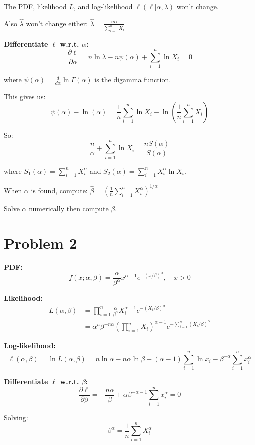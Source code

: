 \documentclass{article}
\begin{document}
The PDF, likelihood $L$, and log-likelihood $\ell(\ell | \alpha, \lambda)$ won't change.

Also $\hat{\lambda}$ won't change either: $\hat{\lambda} = \frac{n\alpha}{\sum_{i=1}^{n} X_i}$

\textbf{Differentiate $\ell$ w.r.t. $\alpha$:}
\[
\frac{\partial \ell}{\partial \alpha} = n \ln \lambda - n\psi(\alpha) + \sum_{i=1}^{n} \ln X_i = 0
\]

where $\psi(\alpha) = \frac{d}{d\alpha} \ln \Gamma(\alpha)$ is the digamma function.

This gives us:
\[
\boxed{\psi(\alpha) - \ln(\alpha) = \frac{1}{n} \sum_{i=1}^{n} \ln X_i - \ln\left(\frac{1}{n} \sum_{i=1}^{n} X_i\right)}
\]

So:
\[
\frac{n}{\alpha} + \sum_{i=1}^{n} \ln X_i = \frac{n S(\alpha)}{S(\alpha)}
\]

where $S_1(\alpha) = \sum_{i=1}^{n} X_i^\alpha$ and $S_2(\alpha) = \sum_{i=1}^{n} X_i^\alpha \ln X_i$.

When $\alpha$ is found, compute: $\hat{\beta} = \left(\frac{1}{n}\sum_{i=1}^{n} X_i^\alpha\right)^{1/\alpha}$

Solve $\alpha$ numerically then compute $\beta$.

\section{Problem 2}

\textbf{PDF:}
\[
f(x; \alpha, \beta) = \frac{\alpha}{\beta^\alpha} x^{\alpha-1} e^{-(x/\beta)^\alpha}, \quad x > 0
\]

\textbf{Likelihood:}
\begin{align*}
L(\alpha, \beta) &= \prod_{i=1}^{n} \frac{\alpha}{\beta^\alpha} X_i^{\alpha-1} e^{-(X_i/\beta)^\alpha} \\
&= \alpha^n \beta^{-n\alpha} \left(\prod_{i=1}^{n} X_i\right)^{\alpha-1} e^{-\sum_{i=1}^{n} (X_i/\beta)^\alpha}
\end{align*}

\textbf{Log-likelihood:}
\[
\ell(\alpha, \beta) = \ln L(\alpha, \beta) = n \ln \alpha - n\alpha \ln \beta + (\alpha-1) \sum_{i=1}^{n} \ln x_i - \beta^{-\alpha} \sum_{i=1}^{n} x_i^\alpha
\]

\textbf{Differentiate $\ell$ w.r.t. $\beta$:}
\[
\frac{\partial \ell}{\partial \beta} = -\frac{n\alpha}{\beta} + \alpha \beta^{-\alpha-1} \sum_{i=1}^{n} x_i^\alpha = 0
\]

Solving:
\[
\beta^\alpha = \frac{1}{n} \sum_{i=1}^{n} X_i^\alpha
\]
\end{document}

